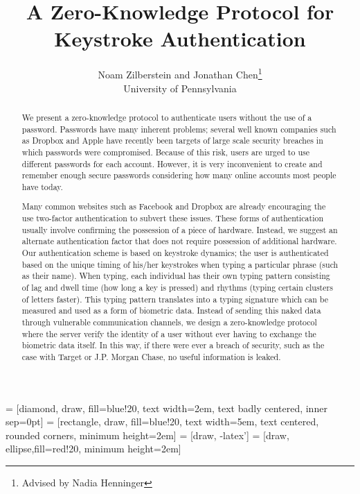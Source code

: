 \documentclass[11pt]{article}
\begin{document}
 = [diamond, draw, fill=blue!20, 
    text width=2em, text badly centered, inner sep=0pt]
 = [rectangle, draw, fill=blue!20, 
    text width=5em, text centered, rounded corners, minimum height=2em]
 = [draw, -latex']
 = [draw, ellipse,fill=red!20,
    minimum height=2em]

\title{A Zero-Knowledge Protocol for Keystroke Authentication}

\author{Noam Zilberstein and Jonathan Chen\thanks{Advised by Nadia Henninger} \\
University of Pennsylvania
}

\maketitle

\begin{abstract}
  We present a zero-knowledge protocol to authenticate users without the use of a password. Passwords have many inherent problems; several well known companies such as Dropbox and Apple have recently been targets of large scale security breaches in which passwords were compromised. Because of this risk, users are urged to use different passwords for each account. However, it is very inconvenient to create and remember enough secure passwords considering how many online accounts most people have today.

Many common websites such as Facebook and Dropbox are already encouraging the use two-factor authentication to subvert these issues. These forms of authentication usually involve confirming the possession of a piece of hardware. Instead, we suggest an alternate authentication factor that does not require possession of additional hardware. Our authentication scheme is based on keystroke dynamics; the user is authenticated based on the unique timing of his/her keystrokes when typing a particular phrase (such as their name). When typing, each individual has their own typing pattern consisting of lag and dwell time (how long a key is pressed) and rhythms (typing certain clusters of letters faster).  This typing pattern translates into a typing signature which can be measured and used as a form of biometric data. Instead of sending this naked data through vulnerable communication channels, we design a zero-knowledge protocol where the server verify the identity of a user without ever having to exchange the biometric data itself. In this way, if there were ever a breach of security, such as the case with Target or J.P. Morgan Chase, no useful information is leaked.
\end{abstract}
\end{document}

